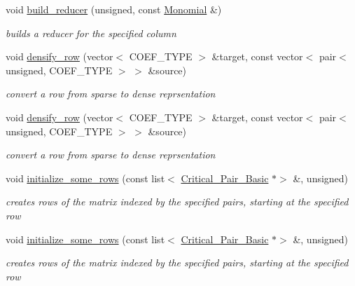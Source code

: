 \begin{DoxyCompactItemize}
void \hyperlink{group___g_b_computation_a385d863722c1e2f9e9769ba27b5cb374}{build\+\_\+reducer} (unsigned, const \hyperlink{group__polygroup_class_monomial}{Monomial} \&)
\begin{DoxyCompactList}\small\item\em builds a reducer for the specified column \end{DoxyCompactList}\item 
void \hyperlink{group___g_b_computation_a7c30bf1632513f7f951cffdae9810130}{densify\+\_\+row} (vector$<$ C\+O\+E\+F\+\_\+\+T\+Y\+PE $>$ \&target, const vector$<$ pair$<$ unsigned, C\+O\+E\+F\+\_\+\+T\+Y\+PE $>$ $>$ \&source)
\begin{DoxyCompactList}\small\item\em convert a row from sparse to dense reprsentation \end{DoxyCompactList}\item 
void \hyperlink{group___g_b_computation_a7c30bf1632513f7f951cffdae9810130}{densify\+\_\+row} (vector$<$ C\+O\+E\+F\+\_\+\+T\+Y\+PE $>$ \&target, const vector$<$ pair$<$ unsigned, C\+O\+E\+F\+\_\+\+T\+Y\+PE $>$ $>$ \&source)
\begin{DoxyCompactList}\small\item\em convert a row from sparse to dense reprsentation \end{DoxyCompactList}\item 
\mbox{\label{group___g_b_computation_abdcffbc4a0a83211bea0385d851a4fb4}} 
void \hyperlink{group___g_b_computation_abdcffbc4a0a83211bea0385d851a4fb4}{initialize\+\_\+some\+\_\+rows} (const list$<$ \hyperlink{group___g_b_computation_class_critical___pair___basic}{Critical\+\_\+\+Pair\+\_\+\+Basic} $\ast$$>$ \&, unsigned)
\begin{DoxyCompactList}\small\item\em creates rows of the matrix indexed by the specified pairs, starting at the specified row \end{DoxyCompactList}\item 
\mbox{\label{group___g_b_computation_abdcffbc4a0a83211bea0385d851a4fb4}} 
void \hyperlink{group___g_b_computation_abdcffbc4a0a83211bea0385d851a4fb4}{initialize\+\_\+some\+\_\+rows} (const list$<$ \hyperlink{group___g_b_computation_class_critical___pair___basic}{Critical\+\_\+\+Pair\+\_\+\+Basic} $\ast$$>$ \&, unsigned)
\begin{DoxyCompactList}\small\item\em creates rows of the matrix indexed by the specified pairs, starting at the specified row \end{DoxyCompactList}\item 

\end{DoxyCompactItemize}
